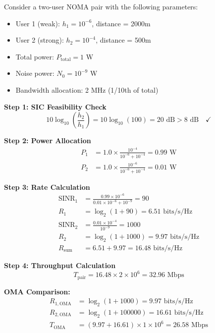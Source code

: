 \documentclass[11pt,a4paper]{article}
\begin{document}
Consider a two-user NOMA pair with the following parameters:

\begin{itemize}
    \item User 1 (weak): $h_1 = 10^{-6}$, distance = 2000m
    \item User 2 (strong): $h_2 = 10^{-4}$, distance = 500m
    \item Total power: $P_{\text{total}} = 1$ W
    \item Noise power: $N_0 = 10^{-9}$ W
    \item Bandwidth allocation: 2 MHz (1/10th of total)
\end{itemize}

\textbf{Step 1: SIC Feasibility Check}
\begin{equation}
10 \log_{10}\left(\frac{h_2}{h_1}\right) = 10 \log_{10}(100) = 20 \text{ dB} > 8 \text{ dB} \quad \checkmark
\end{equation}

\textbf{Step 2: Power Allocation}
\begin{align}
P_1 &= 1.0 \times \frac{10^{-4}}{10^{-6} + 10^{-4}} = 0.99 \text{ W} \\
P_2 &= 1.0 \times \frac{10^{-6}}{10^{-6} + 10^{-4}} = 0.01 \text{ W}
\end{align}

\textbf{Step 3: Rate Calculation}
\begin{align}
\text{SINR}_1 &= \frac{0.99 \times 10^{-6}}{0.01 \times 10^{-6} + 10^{-9}} = 90 \\
R_1 &= \log_2(1 + 90) = 6.51 \text{ bits/s/Hz} \\
\text{SINR}_2 &= \frac{0.01 \times 10^{-4}}{10^{-9}} = 1000 \\
R_2 &= \log_2(1 + 1000) = 9.97 \text{ bits/s/Hz} \\
R_{\text{sum}} &= 6.51 + 9.97 = 16.48 \text{ bits/s/Hz}
\end{align}

\textbf{Step 4: Throughput Calculation}
\begin{equation}
T_{\text{pair}} = 16.48 \times 2 \times 10^6 = 32.96 \text{ Mbps}
\end{equation}

\textbf{OMA Comparison:}
\begin{align}
R_{1,\text{OMA}} &= \log_2(1 + 1000) = 9.97 \text{ bits/s/Hz} \\
R_{2,\text{OMA}} &= \log_2(1 + 100000) = 16.61 \text{ bits/s/Hz} \\
T_{\text{OMA}} &= (9.97 + 16.61) \times 1 \times 10^6 = 26.58 \text{ Mbps}
\end{align}
\end{document}
